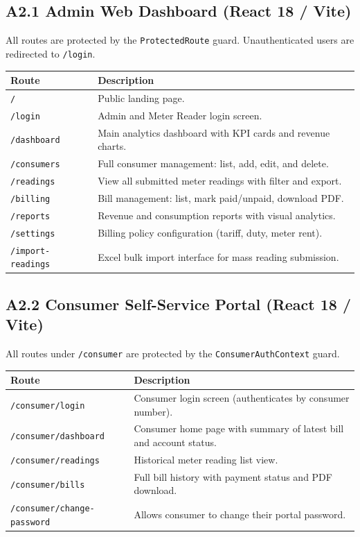 \documentclass[12pt, a4paper, onecolumn]{report}
\begin{document}
\subsection*{A2.1 Admin Web Dashboard (React 18 / Vite)}
All routes are protected by the \texttt{ProtectedRoute} guard. Unauthenticated users are redirected to \texttt{/login}.

\begin{tabularx}{\textwidth}{|p{4.5cm}|X|}
\hline
\textbf{Route} & \textbf{Description} \\
\hline
\texttt{/} & Public landing page. \\
\hline
\texttt{/login} & Admin and Meter Reader login screen. \\
\hline
\texttt{/dashboard} & Main analytics dashboard with KPI cards and revenue charts. \\
\hline
\texttt{/consumers} & Full consumer management: list, add, edit, and delete. \\
\hline
\texttt{/readings} & View all submitted meter readings with filter and export. \\
\hline
\texttt{/billing} & Bill management: list, mark paid/unpaid, download PDF. \\
\hline
\texttt{/reports} & Revenue and consumption reports with visual analytics. \\
\hline
\texttt{/settings} & Billing policy configuration (tariff, duty, meter rent). \\
\hline
\texttt{/import-readings} & Excel bulk import interface for mass reading submission. \\
\hline
\end{tabularx}

\vspace{0.8em}
\subsection*{A2.2 Consumer Self-Service Portal (React 18 / Vite)}
All routes under \texttt{/consumer} are protected by the \texttt{ConsumerAuthContext} guard.

\begin{tabularx}{\textwidth}{|p{4.5cm}|X|}
\hline
\textbf{Route} & \textbf{Description} \\
\hline
\texttt{/consumer/login} & Consumer login screen (authenticates by consumer number). \\
\hline
\texttt{/consumer/dashboard} & Consumer home page with summary of latest bill and account status. \\
\hline
\texttt{/consumer/readings} & Historical meter reading list view. \\
\hline
\texttt{/consumer/bills} & Full bill history with payment status and PDF download. \\
\hline
\texttt{/consumer/change-password} & Allows consumer to change their portal password. \\
\hline
\end{tabularx}
\end{document}
